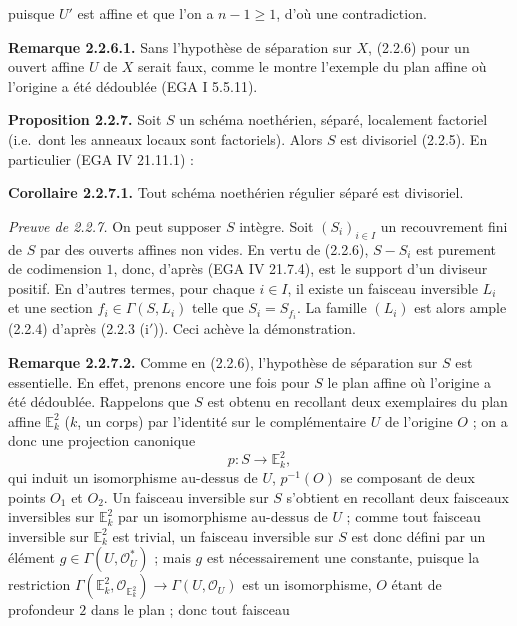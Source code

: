 puisque $U'$ est affine et que l'on a $n-1\ge1$, d'où une contradiction.

\textbf{Remarque 2.2.6.1.} Sans l'hypothèse de séparation sur $X$, (2.2.6) pour un ouvert affine $U$ de $X$ serait faux, comme le montre l'exemple du plan affine où l'origine a été dédoublée (EGA I 5.5.11).

\textbf{Proposition 2.2.7.} Soit $S$ un schéma noethérien, séparé, localement factoriel (i.e.\ dont les anneaux locaux sont factoriels). Alors $S$ est divisoriel (2.2.5). En particulier (EGA IV 21.11.1) :

\textbf{Corollaire 2.2.7.1.} Tout schéma noethérien régulier séparé est divisoriel.

\emph{Preuve de 2.2.7.} On peut supposer $S$ intègre. Soit $(S_i)_{i\in I}$ un recouvrement fini de $S$ par des ouverts affines non vides. En vertu de (2.2.6), $S-S_i$ est purement de codimension $1$, donc, d'après (EGA IV 21.7.4), est le support d'un diviseur positif. En d'autres termes, pour chaque $i\in I$, il existe un faisceau inversible $L_i$ et une section $f_i\in\Gamma(S,L_i)$ telle que $S_i=S_{f_i}$. La famille $(L_i)$ est alors ample (2.2.4) d'après (2.2.3 (i$'$)). Ceci achève la démonstration.

\textbf{Remarque 2.2.7.2.} Comme en (2.2.6), l'hypothèse de séparation sur $S$ est essentielle. En effet, prenons encore une fois pour $S$ le plan affine où l'origine a été dédoublée. Rappelons que $S$ est obtenu en recollant deux exemplaires du plan affine $\mathbb E^2_k$ ($k$, un corps) par l'identité sur le complémentaire $U$ de l'origine $O$ ; on a donc une projection canonique
\[
p:S\longrightarrow\mathbb E^2_k,
\]
qui induit un isomorphisme au-dessus de $U$, $p^{-1}(O)$ se composant de deux points $O_1$ et $O_2$. Un faisceau inversible sur $S$ s'obtient en recollant deux faisceaux inversibles sur $\mathbb E^2_k$ par un isomorphisme au-dessus de $U$ ; comme tout faisceau inversible sur $\mathbb E^2_k$ est trivial, un faisceau inversible sur $S$ est donc défini par un élément $g\in\Gamma(U,\mathcal O_U^*)$ ; mais $g$ est nécessairement une constante, puisque la restriction $\Gamma(\mathbb E^2_k,\mathcal O_{\mathbb E^2_k})\to\Gamma(U,\mathcal O_U)$ est un isomorphisme, $O$ étant de profondeur $2$ dans le plan ; donc tout faisceau
